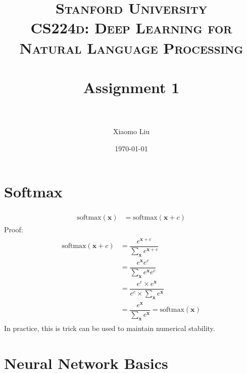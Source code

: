 \documentclass[paper=a4, fontsize=11pt]{scrartcl} %
\title{	
\normalfont \normalsize 
\textsc{Stanford University} \\ [25pt] %
\textsc{CS224d: Deep Learning for Natural Language Processing} \\ [25pt] %
\horrule{0.5pt} \\[0.4cm] %
\huge Assignment 1 \\ %
\horrule{2pt} \\[0.5cm] %
}
\author{Xiaomo Liu} %
\date{\normalsize\today} %
\numberwithin{equation}{section} %
\numberwithin{figure}{section} %
\numberwithin{table}{section} %
\begin{document}
\maketitle %


\section{Softmax}
\begin{align} 
\begin{split}
\mbox{softmax}(\textbf{x}) &= \mbox{softmax}(\textbf{x}+c) 
\end{split}					
\end{align}
Proof:
\begin{align} 
\begin{split}
\mbox{softmax}(\textbf{x}+c) &= \dfrac{e^{\textbf{x}+c}}{\sum_{\textbf{x}}e^{\textbf{x}+c}} \\
                    &= \dfrac{e^{\textbf{x}} e^{c}}{ \sum_{\textbf{x}} e^{\textbf{x}} e^{c}} \\
                    &= \dfrac{e^{c} \times e^{\textbf{x}} }{e^{c} \times \sum_{\textbf{x}}{e^{\textbf{x}}}} \\
                    &= \dfrac{e^{\textbf{x}}}{\sum_{\textbf{x}}{e^{\textbf{x}}}} = \mbox{softmax}(\textbf{x})
\end{split}					
\end{align}
In practice, this is trick can be used to maintain numerical stability.

\section{Neural Network Basics}
\end{document}
